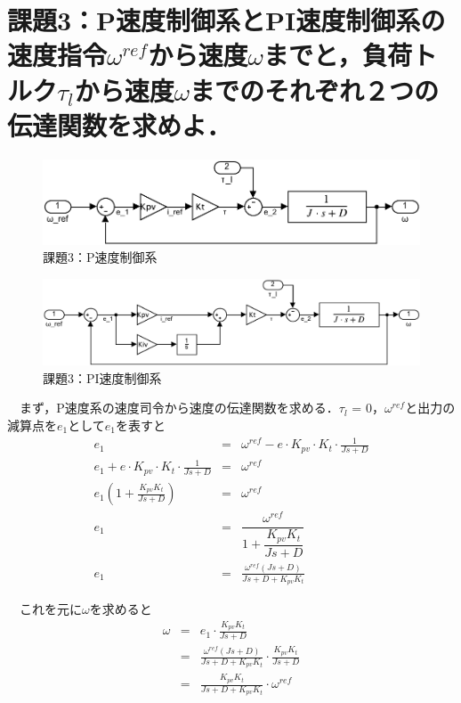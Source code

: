 \section{課題3：P速度制御系とPI速度制御系の速度指令$\omega^{ref}$から速度$\omega$までと，負荷トルク$\tau_l$から速度$\omega$までのそれぞれ２つの伝達関数を求めよ．}
\begin{figure}[H]
    \centering
    \includegraphics[]{./fig/3_P.pdf}
    \caption{課題3：P速度制御系}
\end{figure}
\begin{figure}[H]
    \centering
    \includegraphics[width=15cm]{./fig/3_PI.pdf}
    \caption{課題3：PI速度制御系}
\end{figure}

　まず，P速度系の速度司令から速度の伝達関数を求める．$\tau_l$ = 0，$\omega^{ref}$と出力の減算点を$e_1$として$e_1$を表すと
\begin{eqnarray}
    e_1 &=& \omega^{ref} - e \cdot K_{pv} \cdot K_t \cdot \frac{1}{Js + D} \nonumber \\
    e_1 + e \cdot K_{pv} \cdot K_t \cdot \frac{1}{Js + D}&=& \omega^{ref}  \nonumber \\
    e_1 \left(1 + \frac{K_{pv} K_t}{Js + D} \right) &=& \omega^{ref}  \nonumber \\
    e_1 &=& \dfrac{\omega^{ref}}{1 + \dfrac{K_{pv} K_t}{Js + D}}  \nonumber \\
    e_1 &=& \frac{\omega^{ref}\left(Js+D\right)}{Js + D + K_{pv} K_t}  \nonumber
\end{eqnarray}

　これを元に$\omega$を求めると
\begin{eqnarray}
    \omega &=& e_1 \cdot \frac{K_{pv} K_t}{Js + D} \nonumber \\
           &=& \frac{\omega^{ref}\left(Js+D\right)}{Js + D + K_{pv} K_t} \cdot \frac{K_{pv} K_t}{Js + D} \nonumber \\
           &=& \frac{K_{pv} K_t}{Js + D + K_{pv} K_t} \cdot \omega^{ref}\nonumber
\end{eqnarray}

